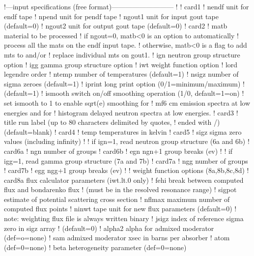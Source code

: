 \small
\begin{ccode}

   !---input specifications (free format)---------------------------
   !
   ! card1
   !    nendf   unit for endf tape
   !    npend   unit for pendf tape
   !    ngout1  unit for input gout tape (default=0)
   !    ngout2  unit for output gout tape (default=0)
   ! card2
   !    matb    material to be processed
   !             if ngout=0, matb<0 is an option to automatically
   !              process all the mats on the endf input tape.
   !             otherwise, matb<0 is a flag to add mts to and/or
   !              replace individual mts on gout1.
   !    ign     neutron group structure option
   !    igg     gamma group structure option
   !    iwt     weight function option
   !    lord    legendre order
   !    ntemp   number of temperatures (default=1)
   !    nsigz   number of sigma zeroes (default=1)
   !    iprint  long print option (0/1=minimum/maximum)
   !            (default=1)
   !    ismooth switch on/off smoothing operation (1/0, default=1=on)
   !            set ismooth to 1 to enable sqrt(e) smoothing for
   !            mf6 cm emission spectra at low energies and for
   !            histogram delayed neutron spectra at low energies.
   ! card3
   !    title   run label (up to 80 characters delimited by quotes,
   !            ended with /)  (default=blank)
   ! card4
   !    temp    temperatures in kelvin
   ! card5
   !    sigz    sigma zero values (including infinity)
   !
   !          if ign=1, read neutron group structure (6a and 6b)
   ! card6a
   !    ngn     number of groups
   ! card6b
   !    egn     ngn+1 group breaks (ev)
   !
   !          if igg=1, read gamma group structure (7a and 7b)
   ! card7a
   !    ngg     number of groups
   ! card7b
   !    egg     ngg+1 group breaks (ev)
   !
   !          weight function options (8a,8b,8c,8d)
   ! card8a     flux calculator parameters (iwt.lt.0 only)
   !    fehi    break between computed flux and bondarenko flux
   !            (must be in the resolved resonance range)
   !    sigpot  estimate of potential scattering cross section
   !    nflmax  maximum number of computed flux points
   !    ninwt   tape unit for new flux parameters (default=0)
   !            note: weighting flux file is always written binary
   !    jsigz   index of reference sigma zero in sigz array
   !            (default=0)
   !    alpha2   alpha for admixed moderator (def=o=none)
   !    sam      admixed moderator xsec in barns per absorber
   !             atom (def=0=none)
   !    beta     heterogeneity parameter (def=0=none)

\end{ccode}
